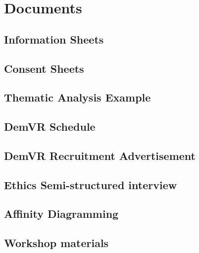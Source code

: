 
\chapter{Documents}

\section{Information Sheets}
\label{app:infoSheets}

\section{Consent Sheets}
\label{app:ConSheets}

\section{Thematic Analysis Example}
\label{app:TA}

\section{DemVR Schedule}
\label{app:DemVRSchedule}

\section{DemVR Recruitment Advertisement}
\label{app:DemVRRecruitment}

\section{Ethics Semi-structured interview}
\label{app:EthicInterview}

\section{Affinity Diagramming}
\label{app:AD}

\section{Workshop materials}
\label{app:ToolkitMaterials}